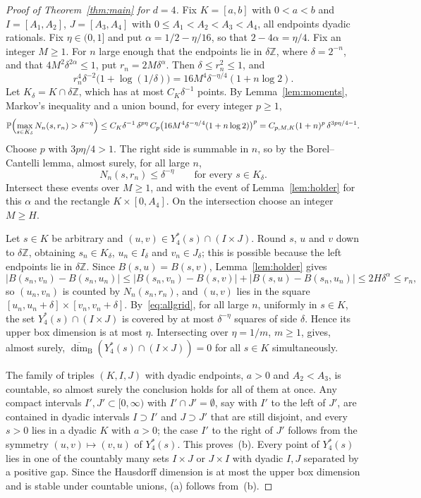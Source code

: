 \documentclass[11pt]{amsart}
\theoremstyle{remark}
\newcommand{\Z}{\mathbb{Z}}
\newcommand{\PP}{\mathbb{P}}
\newcommand{\dimB}{\overline{\dim}_{\mathrm B}}
\begin{document}
\begin{proof}[Proof of Theorem~\ref{thm:main} for $d=4$]
Fix $K=[a,b]$ with $0<a<b$ and $I=[A_1,A_2]$, $J=[A_3,A_4]$ with $0\le A_1<A_2<A_3<A_4$, all endpoints dyadic rationals.
Fix $\eta\in(0,1]$ and put $\alpha=1/2-\eta/16$, so that $2-4\alpha=\eta/4$. Fix an integer $M\ge1$. For $n$ large
enough that the endpoints lie in $\delta\Z$, where $\delta=2^{-n}$, and that $4M^2\delta^{2\alpha}\le1$, put
$r_n=2M\delta^\alpha$. Then $\delta\le r_n^2\le1$, and
\[
r_n^4\delta^{-2}\bigl(1+\log(1/\delta)\bigr)=16M^4\delta^{-\eta/4}(1+n\log2).
\]
Let $K_\delta=K\cap\delta\Z$, which has at most $C_K\delta^{-1}$ points. By Lemma~\ref{lem:moments}, Markov's
inequality and a union bound, for every integer $p\ge1$,
\[
\PP\Bigl(\max_{s\in K_\delta}N_n(s,r_n)>\delta^{-\eta}\Bigr)\le C_K\delta^{-1}\,\delta^{p\eta}\,C_p\bigl(16M^4\delta^{-\eta/4}
(1+n\log2)\bigr)^p=C_{p,M,K}(1+n)^p\,\delta^{3p\eta/4-1}.
\]
Choose $p$ with $3p\eta/4>1$. The right side is summable in $n$, so by the Borel--Cantelli lemma, almost surely, for all
large $n$,
\begin{equation}\label{eq:allgrid}
N_n(s,r_n)\le\delta^{-\eta}\qquad\text{for every }s\in K_\delta.
\end{equation}
Intersect these events over $M\ge1$, and with the event of Lemma~\ref{lem:holder} for this $\alpha$ and the rectangle
$K\times[0,A_4]$. On the intersection choose an integer $M\ge H$.

Let $s\in K$ be arbitrary and $(u,v)\in Y^*_4(s)\cap(I\times J)$. Round $s$, $u$ and $v$ down to $\delta\Z$, obtaining
$s_n\in K_\delta$, $u_n\in I_\delta$ and $v_n\in J_\delta$; this is possible because the left endpoints lie in
$\delta\Z$. Since $B(s,u)=B(s,v)$, Lemma~\ref{lem:holder} gives
\[
|B(s_n,v_n)-B(s_n,u_n)|\le|B(s_n,v_n)-B(s,v)|+|B(s,u)-B(s_n,u_n)|\le2H\delta^\alpha\le r_n,
\]
so $(u_n,v_n)$ is counted by $N_n(s_n,r_n)$, and $(u,v)$ lies in the square $[u_n,u_n+\delta]\times[v_n,v_n+\delta]$.
By~\eqref{eq:allgrid}, for all large $n$, uniformly in $s\in K$, the set $Y^*_4(s)\cap(I\times J)$ is covered by at most
$\delta^{-\eta}$ squares of side $\delta$. Hence its upper box dimension is at most $\eta$. Intersecting over
$\eta=1/m$, $m\ge1$, gives, almost surely, $\dimB(Y^*_4(s)\cap(I\times J))=0$ for all $s\in K$ simultaneously.

The family of triples $(K,I,J)$ with dyadic endpoints, $a>0$ and $A_2<A_3$, is countable, so almost surely the
conclusion holds for all of them at once. Any compact intervals $I',J'\subset[0,\infty)$ with $I'\cap J'=\emptyset$, say
with $I'$ to the left of $J'$, are contained in dyadic intervals $I\supset I'$ and $J\supset J'$ that are still disjoint,
and every $s>0$ lies in a dyadic $K$ with $a>0$; the case $I'$ to the right of $J'$ follows from the symmetry
$(u,v)\mapsto(v,u)$ of $Y^*_4(s)$. This proves~(b). Every point of $Y^*_4(s)$ lies in one of the countably many sets
$I\times J$ or $J\times I$ with dyadic $I,J$ separated by a positive gap. Since the Hausdorff dimension is at most the
upper box dimension and is stable under countable unions, (a) follows from~(b).
\end{proof}
\end{document}
